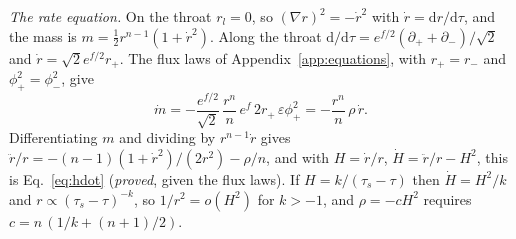 \documentclass[11pt]{article}
\newcommand{\dd}{\mathrm{d}}
\begin{document}
\emph{The rate equation.} On the throat $r_l=0$, so $(\nabla r)^2=-\dot r^2$ with $\dot r=\dd r/\dd\tau$, and the mass
is $m=\tfrac12r^{n-1}(1+\dot r^2)$. Along the throat $\dd/\dd\tau=e^{f/2}(\partial_++\partial_-)/\sqrt2$ and
$\dot r=\sqrt2e^{f/2}r_+$. The flux laws of Appendix~\ref{app:equations}, with $r_+=r_-$ and $\phi_+^2=\phi_-^2$, give
\begin{equation}
\dot m=-\frac{e^{f/2}}{\sqrt2}\,\frac{r^n}{n}\,e^f\,2r_+\,\varepsilon\phi_+^2=-\frac{r^n}{n}\,\rho\,\dot r.
\end{equation}
Differentiating $m$ and dividing by $r^{n-1}\dot r$ gives $\ddot r/r=-(n-1)(1+\dot r^2)/(2r^2)-\rho/n$, and with
$H=\dot r/r$, $\dot H=\ddot r/r-H^2$, this is Eq.~\eqref{eq:hdot} (\emph{proved}, given the flux laws). If
$H=k/(\tau_s-\tau)$ then $\dot H=H^2/k$ and $r\propto(\tau_s-\tau)^{-k}$, so $1/r^2=o(H^2)$ for $k>-1$, and
$\rho=-cH^2$ requires $c=n\,(1/k+(n+1)/2)$.
\end{document}
